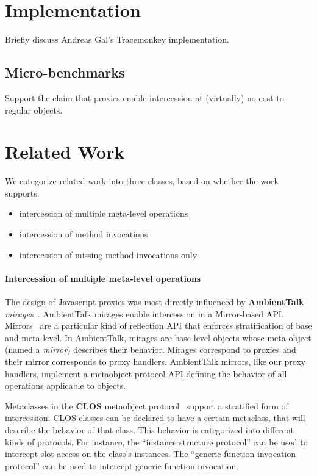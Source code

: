 \documentclass{acm_proc_article-sp}
\begin{document}
\section{Implementation}
Briefly discuss Andreas Gal's Tracemonkey implementation.

\subsection{Micro-benchmarks}
Support the claim that proxies enable intercession at (virtually) no cost to regular objects.

\section{Related Work}

We categorize related work into three classes, based on whether the work supports:
\begin{itemize}
  \item intercession of multiple meta-level operations
  \item intercession of method invocations
  \item intercession of missing method invocations only
\end{itemize}


\paragraph{Intercession of multiple meta-level operations}

The design of Javascript proxies was most directly influenced by \textbf{AmbientTalk} \emph{mirages}~\cite{mirages_dls_07,spe_journal_08}. AmbientTalk mirages enable intercession in a Mirror-based API. Mirrors~\cite{bracha_04_mirrors_oopsla} are a particular kind of reflection API that enforces stratification of base and meta-level. In AmbientTalk, mirages are base-level objects whose meta-object (named a \emph{mirror}) describes their behavior. Mirages correspond to proxies and their mirror corresponds to proxy handlers. AmbientTalk mirrors, like our proxy handlers, implement a metaobject protocol API defining the behavior of all operations applicable to objects.

Metaclasses in the \textbf{CLOS} metaobject protocol~\cite{clos} support a stratified form of intercession. CLOS classes can be declared to have a certain metaclass, that will describe the behavior of that class. This behavior is categorized into different kinds of protocols. For instance, the ``instance structure protocol'' can be used to intercept slot access on the class's instances. The ``generic function invocation protocol'' can be used to intercept generic function invocation.
\end{document}
